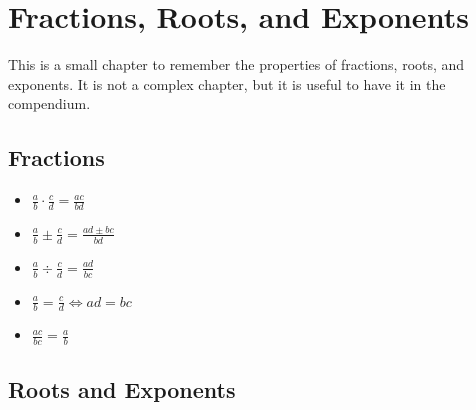 \newpage
\section{Fractions, Roots, and Exponents}

This is a small chapter to remember the properties of fractions, roots, and exponents. 
It is not a complex chapter, but it is useful to have it in the compendium.

\subsection{Fractions}

\begin{itemize}
    
    \item \(\frac{a}{b} \cdot \frac{c}{d} = \frac{ac}{bd}\)
    
    \item \(\frac{a}{b} \pm \frac{c}{d} = \frac{ad \pm bc}{bd}\)
    
    \item \(\frac{a}{b} \div \frac{c}{d} = \frac{ad}{bc}\)
    
    \item \(\frac{a}{b} = \frac{c}{d} \iff ad = bc\)
    
    \item \(\frac{ac}{bc} = \frac{a}{b}\)

\end{itemize}

\subsection{Roots and Exponents}

